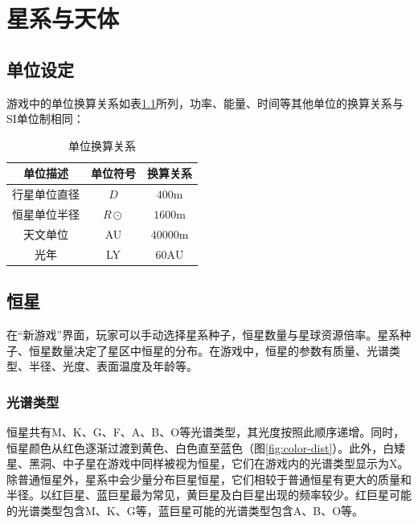 \chapter{星系与天体}

\label{chap:spheres}

\section*{单位设定}

游戏中的单位换算关系如表\ref{tbl:unit-conversion}所列，功率、能量、时间等其他单位的换算关系与SI单位制相同：

\begin{table}[h]
    \centering
    \small
    \caption{单位换算关系}
    \begin{tabular}{ccc}
        \toprule
        单位描述 & 单位符号 & 换算关系 \\
        \midrule
        行星单位直径 & $D$ & $400\mathrm m$ \\
        恒星单位半径 & $R\odot$ & $1600\mathrm m$ \\
        天文单位 & AU & $40000\mathrm m$ \\
        光年 & LY & $60\mathrm {AU}$ \\
        \bottomrule
    \end{tabular}
    \label{tbl:unit-conversion}
\end{table}

\section{恒星}

在“新游戏”界面，玩家可以手动选择星系种子，恒星数量与星球资源倍率。星系种子、恒星数量决定了星区中恒星的分布。在游戏中，恒星的参数有质量、光谱类型、半径、光度、表面温度及年龄等。

\subsection{光谱类型}


恒星共有M、K、G、F、A、B、O等光谱类型，其光度按照此顺序递增。同时，恒星颜色从红色逐渐过渡到黄色、白色直至蓝色（图\ref{fig:color-dist}）。此外，白矮星、黑洞、中子星在游戏中同样被视为恒星，它们在游戏内的光谱类型显示为X。除普通恒星外，星系中会少量分布巨星恒星，它们相较于普通恒星有更大的质量和半径。以红巨星、蓝巨星最为常见，黄巨星及白巨星出现的频率较少。红巨星可能的光谱类型包含M、K、G等，蓝巨星可能的光谱类型包含A、B、O等。

